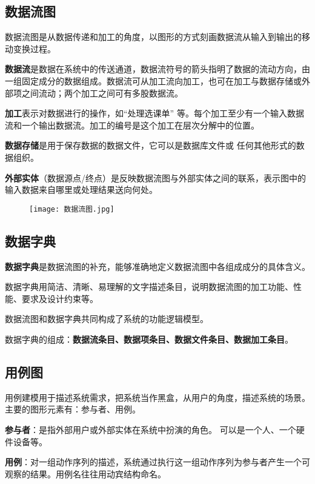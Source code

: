 \documentclass[cn, blue, normal, 12pt]{elegantnote}
\begin{document}
\subsection{数据流图}

数据流图是从数据传递和加工的角度，以图形的方式刻画数据流从输入到输出的移动变换过程。

\textbf{数据流}是数据在系统中的传送通道，数据流符号的箭头指明了数据的流动方向，由一组固定成分的数据组成。数据流可从加工流向加工，也可在加工与数据存储或外部项之间流动；两个加工之间可有多股数据流。

\textbf{加工}表示对数据进行的操作，如“处理选课单” 等。每个加工至少有一个输入数据流和一个输出数据流。加工的编号是这个加工在层次分解中的位置。

\textbf{数据存储}是用于保存数据的数据文件，它可以是数据库文件或
任何其他形式的数据组织。

\textbf{外部实体}（数据源点/终点）是反映数据流图与外部实体之间的联系，表示图中的输入数据来自哪里或处理结果送向何处。

\begin{figure}[htbp]
    \centering
    \texttt{[image: 数据流图.jpg]}
\end{figure}

\subsection{数据字典}

\textbf{数据字典}是数据流图的补充，能够准确地定义数据流图中各组成成分的具体含义。

数据字典用简洁、清晰、易理解的文字描述条目，说明数据流图的加工功能、性能、要求及设计约束等。

数据流图和数据字典共同构成了系统的功能逻辑模型。

数据字典的组成：\textbf{数据流条目、数据项条目、数据文件条目、数据加工条目}。

\subsection{用例图}

用例建模用于描述系统需求，把系统当作黑盒，从用户的角度，描述系统的场景。主要的图形元素有：参与者、用例。

\textbf{参与者}：是指外部用户或外部实体在系统中扮演的角色。 可以是一个人、一个硬件设备等。

\textbf{用例}：对一组动作序列的描述，系统通过执行这一组动作序列为参与者产生一个可观察的结果。用例名往往用动宾结构命名。
\end{document}
